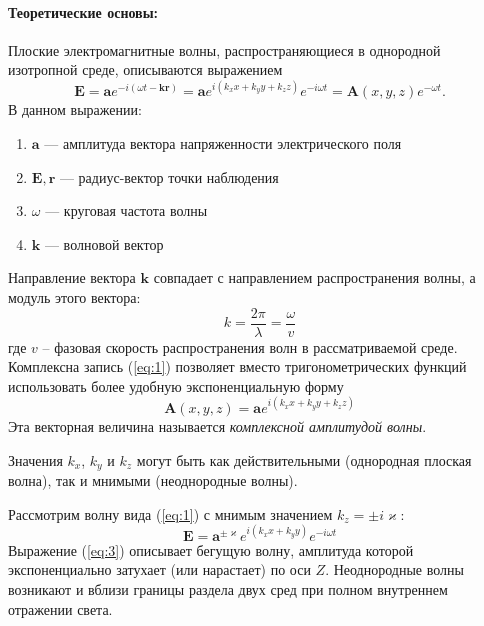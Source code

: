 \documentclass[a4paper, 12pt]{article}
\begin{document}
	\paragraph{Теоретические основы:}
	Плоские электромагнитные волны, распространяющиеся в однородной изотропной среде, описываются выражением
	\begin{equation}
		\boldsymbol{E}=\boldsymbol{a}e^{-i\left(\omega t-\boldsymbol{kr}\right)}=\boldsymbol{a}e^{i\left(k_xx+k_yy+k_zz\right)}e^{-i\omega t}=\boldsymbol{A}\left(x,y,z\right)e^{-\omega t}.
		\label{eq:1}
	\end{equation}
	В данном выражении:\par
	\begin{enumerate}
		\item $\boldsymbol{a}$ — амплитуда вектора напряженности электрического поля
		\item $\boldsymbol{E,r}$ — радиус-вектор точки наблюдения
		\item $\omega$ — круговая частота волны
		\item $\boldsymbol{k}$ — волновой вектор
	\end{enumerate}
	Направление вектора $\boldsymbol{k}$ совпадает с направлением распространения волны, а модуль этого вектора:
	\begin{equation*}
		k=\frac{2\pi}{\lambda}=\frac{\omega}{v}
	\end{equation*}
	где $v$ – фазовая скорость распространения волн в рассматриваемой среде. Комплексна запись (\ref{eq:1}) позволяет вместо тригонометрических функций использовать более удобную экспоненциальную форму
	\begin{equation}
		\boldsymbol{A}\left(x,y,z\right)=\boldsymbol{a}e^{i\left(k_xx+k_yy+k_zz\right)}
	\end{equation}
	Эта векторная величина называется \textit{комплексной амплитудой волны}.\par
	Значения $k_x$, $k_y$ и $k_z$ могут быть как действительными (однородная плоская волна), так и мнимыми (неоднородные волны).\par
	Рассмотрим волну вида (\ref{eq:1}) с мнимым значением $k_z=\pm i\boldsymbol{\varkappa}$:
	\begin{equation}
		\boldsymbol{E}=\boldsymbol{a}^{\pm\boldsymbol{\varkappa}}e^{i\left(k_xx+k_yy\right)}e^{-i\omega t}
		\label{eq:3}
	\end{equation}
	Выражение (\ref{eq:3}) описывает бегущую волну, амплитуда которой экспоненциально затухает (или нарастает) по оси $Z$. Неоднородные волны возникают и вблизи границы раздела двух сред при полном внутреннем отражении света.\par
\end{document}
